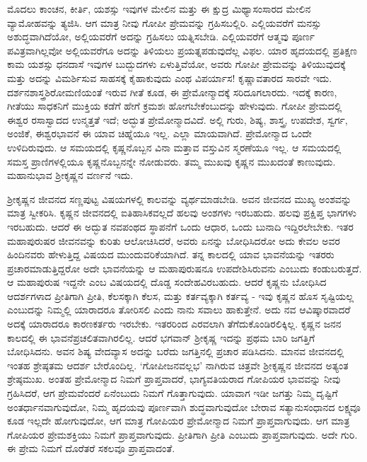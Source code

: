 ಮೊದಲು ಕಾಂಚನ, ಕೀರ್ತಿ, ಯಶಸ್ಸು ಇವುಗಳ ಮೇಲಿನ ಮತ್ತು ಈ ಕ್ಷುದ್ರ ಮಿಥ್ಯಾಸಂಸಾರದ ಮೇಲಿನ ವ್ಯಾಮೋಹವನ್ನು ತ್ಯಜಿಸಿ. ಆಗ ಮಾತ್ರ ನೀವು ಗೋಪೀ ಪ್ರೇಮವನ್ನು ಗ್ರಹಿಸಬಲ್ಲಿರಿ. ಎಲ್ಲಿಯವರೆಗೆ ಮನಸ್ಸು ಅಶುದ್ಧವಾಗಿದೆಯೋ, ಅಲ್ಲಿಯವರೆಗೆ ಅದನ್ನು ಗ್ರಹಿಸಲು ಯತ್ನಿಸಬೇಡಿ. ಎಲ್ಲಿಯವರೆಗೆ ಆತ್ಮವು ಪೂರ್ಣ ಪವಿತ್ರವಾಗಿಲ್ಲವೋ ಅಲ್ಲಿಯವರೆಗೂ ಅದನ್ನು ತಿಳಿಯಲು ಪ್ರಯತ್ನಪಡುವುದೆಲ್ಲ ವಿಫಲ. ಯಾರ ಹೃದಯದಲ್ಲಿ ಪ್ರತಿಕ್ಷಣ ಕಾಮ ಯಶಸ್ಸು ಧನದಾಸೆ ಇವುಗಳ ಬುದ್ಬುದಗಳು ಏಳುತ್ತಿವೆಯೋ, ಅವರು ಗೋಪೀ ಪ್ರೇಮವನ್ನು ತಿಳಿಯುವುದಕ್ಕೆ ಮತ್ತು ಅದನ್ನು ವಿಮರ್ಶಿಸುವ ಸಾಹಸಕ್ಕೆ ಕೈಹಾಕುವುದು ಎಂಥ ವಿಪರ್ಯಾಸ! ಕೃಷ್ಣಾವತಾರದ ಸಾರವೇ ಇದು. ದರ್ಶನಶಾಸ್ತ್ರಶಿರೋಮಣಿಯಂತೆ ಇರುವ ಗೀತೆ ಕೂಡ, ಈ ಪ್ರೇಮೋನ್ಮಾದಕ್ಕೆ ಸರಿದೂಗಲಾರದು. ಇದಕ್ಕೆ ಕಾರಣ, ಗೀತೆಯು ಸಾಧಕನಿಗೆ ಮುಕ್ತಿಯ ಕಡೆಗೆ ಹೇಗೆ ಕ್ರಮಶಃ ಹೋಗಬೇಕೆಂಬುದನ್ನು ಹೇಳುವುದು. ಗೋಪೀ ಪ್ರೇಮದಲ್ಲಿ ಈಶ್ವರ ರಸಾಸ್ವಾದದ ಉನ್ಮತ್ತತೆ ಇದೆ; ಅದ್ಭುತ ಪ್ರೇಮೋನ್ಮಾದವಿದೆ. ಅಲ್ಲಿ ಗುರು, ಶಿಷ್ಯ, ಶಾಸ್ತ್ರ, ಉಪದೇಶ, ಸ್ವರ್ಗ, ಅಂಜಿಕೆ, ಈಶ್ವರಭಾವನೆ ಈ ಯಾವ ಚಿಹ್ನೆಯೂ ಇಲ್ಲ. ಎಲ್ಲಾ ಮಾಯವಾಗಿದೆ. ಪ್ರೇಮೋನ್ಮಾದ ಒಂದೇ ಉಳಿದಿರುವುದು. ಆ ಸಮಯದಲ್ಲಿ ಕೃಷ್ಣನೊಬ್ಬನ ವಿನಾ ಮತ್ತಾವ ವಸ್ತುವಿನ ಸ್ಮರಣೆಯೂ ಇಲ್ಲ. ಆ ಸಮಯದಲ್ಲಿ ಸಮಸ್ತ ಪ್ರಾಣಿಗಳಲ್ಲಿಯೂ ಕೃಷ್ಣನೊಬ್ಬನನ್ನೇ ನೋಡುವರು. ತಮ್ಮ ಮುಖವು ಕೃಷ್ಣನ ಮುಖದಂತೆ ಕಾಣುವುದು. ಮಹಾನುಭಾವ ಶ‍್ರೀಕೃಷ್ಣನ ವರ್ಣನೆ ಇದು.

ಶ‍್ರೀಕೃಷ್ಣನ ಜೀವನದ ಸಣ್ಣಪುಟ್ಟ ವಿಷಯಗಳಲ್ಲಿ ಕಾಲವನ್ನು ವ್ಯರ್ಥಮಾಡಬೇಡಿ. ಅವನ ಜೀವನದ ಮುಖ್ಯ ಅಂಶವನ್ನು ಮಾತ್ರ ಸ್ವೀಕರಿಸಿ. ಕೃಷ್ಣನ ಜೀವನದಲ್ಲಿ ಐತಿಹಾಸಿಕವಲ್ಲದೆ ಹಲವು ಅಂಶಗಳು ಇರಬಹುದು. ಹಲವು ಪ್ರಕ್ಷಿಪ್ತ ಭಾಗಗಳು ಇರಬಹುದು. ಆದರೆ ಈ ಅದ್ಭುತ ನವಪಂಥದ ಸ್ಥಾಪನೆಗೆ ಒಂದು ಆಧಾರ, ಒಂದು ಬುನಾದಿ ಇದ್ದಿರಲೇಬೇಕು. ಇತರ ಮಹಾಪುರುಷರ ಜೀವನವನ್ನು ಕುರಿತು ಆಲೋಚಿಸಿದರೆ, ಅವರು ಏನನ್ನು ಬೋಧಿಸಿದರೋ ಅದು ಕೇವಲ ಅವರ ಹಿಂದಿನವರು ಹೇಳುತ್ತಿದ್ದ ವಿಷಯದ ಮುಂದುವರಿಕೆಯಾಗಿದೆ. ತನ್ನ ಕಾಲದಲ್ಲಿ ಯಾವ ಭಾವನೆಯನ್ನು ಇತರರು ಪ್ರಚಾರಮಾಡುತ್ತಿದ್ದರೋ ಅದೇ ಭಾವನೆಯನ್ನು ಆ ಮಹಾಪುರುಷನೂ ಉಪದೇಶಿಸಿರುವನು ಎಂಬುದು ಕಂಡುಬರುತ್ತದೆ. ಆ ಮಹಾಪುರುಷ ಇದ್ದನೇ ಎಂಬ ವಿಷಯದಲ್ಲಿ ದೊಡ್ಡ ಸಂದೇಹವಿರಬಹುದು. ಆದರೆ ಕೃಷ್ಣನು ಬೋಧಿಸಿದ ಆದರ್ಶಗಳಾದ ಪ್ರೀತಿಗಾಗಿ ಪ್ರೀತಿ, ಕೆಲಸಕ್ಕಾಗಿ ಕೆಲಸ, ಮತ್ತು ಕರ್ತವ್ಯಕ್ಕಾಗಿ ಕರ್ತವ್ಯ - ಇವು ಕೃಷ್ಣನ ಹೊಸ ಸೃಷ್ಟಿಯಲ್ಲ ಎಂಬುದನ್ನು ನಿಮ್ಮಲ್ಲಿ ಯಾರಾದರೂ ತೋರಿಸಲಿ ಎಂದು ನಾನು ಸವಾಲು ಹಾಕುತ್ತೇನೆ. ಅದು ನವ ಆವಿಷ್ಕಾರವಾದರೆ ಅದಕ್ಕೆ ಯಾರಾದರೂ ಕಾರಣಕರ್ತರು ಇರಬೇಕು. ಇತರರಿಂದ ಎರವಲಾಗಿ ತೆಗೆದುಕೊಂಡಿರಲಿಕ್ಕಿಲ್ಲ. ಕೃಷ್ಣನ ಜನನ ಕಾಲದಲ್ಲಿ ಈ ಭಾವನೆಪ್ರಚಲಿತವಾಗಿರಲಿಲ್ಲ. ಆದರೆ ಭಗವಾನ್​ ಶ‍್ರೀಕೃಷ್ಣ ಇದನ್ನು ಪ್ರಥಮ ಬಾರಿ ಜಗತ್ತಿಗೆ ಬೋಧಿಸಿದನು. ಅವನ ಶಿಷ್ಯ ವೇದವ್ಯಾಸ ಅದನ್ನು ಬರೆದು ಜಗತ್ತಿನಲ್ಲಿ ಪ್ರಚಾರ ಪಡಿಸಿದನು. ಮಾನವ ಜೀವನದಲ್ಲಿ ಇಂತಹ ಶ್ರೇಷ್ಠತಮ ಆದರ್ಶ ಬೇರೊಂದಿಲ್ಲ. ‘ಗೋಪೀಜನವಲ್ಲಭ’ ನಾಗಿರುವ ಚಿತ್ರವೇ ಶ‍್ರೀಕೃಷ್ಣನ ಜೀವನದ ಅತ್ಯಂತ ಶ್ರೇಷ್ಠಮುಖ. ಅಂತಹ ಪ್ರೇಮೋನ್ಮಾದ ನಿಮಗೆ ಪ್ರಾಪ್ತವಾದರೆ, ಭಾಗ್ಯವತಿಯರಾದ ಗೋಪಿಯರ ಭಾವವನ್ನು ನೀವು ಗ್ರಹಿಸಿದರೆ, ಆಗ ಪ್ರೇಮವೆಂದರೆ ಏನೆಂಬುದು ನಿಮಗೆ ಗೊತ್ತಾಗುವುದು. ಯಾವಾಗ ಇಡೀ ಜಗತ್ತು ನಿಮ್ಮ ದೃಷ್ಟಿಗೆ ಅಂತರ್ಧಾನವಾಗುವುದೋ, ನಿಮ್ಮ ಹೃದಯವು ಪೂರ್ಣವಾಗಿ ಶುದ್ಧವಾಗುವುದೋ ಬೇರಾವ ಸತ್ಯಾನುಸಂಧಾನದ ಲಕ್ಷ್ಯವೂ ಕೂಡ ಇಲ್ಲದೇ ಹೋಗುವುದೋ, ಆಗ ಮಾತ್ರ ಗೋಪಿಯರ ಪ್ರೇಮೋನ್ಮಾದ ನಿಮಗೆ ಪ್ರಾಪ್ತವಾಗುವುದು. ಆಗ ಮಾತ್ರ ಗೋಪಿಯರ ಪ್ರೇಮಶಕ್ತಿಯು ನಿಮಗೆ ಪ್ರಾಪ್ತವಾಗುವುದು. ಪ್ರೀತಿಗಾಗಿ ಪ್ರೀತಿ ಎಂಬುದು ಪ್ರಾಪ್ತವಾಗುವುದು. ಅದೇ ಗುರಿ. ಈ ಪ್ರೇಮ ನಿಮಗೆ ದೊರೆತರೆ ಸಕಲವೂ ಪ್ರಾಪ್ತವಾದಂತೆ.

